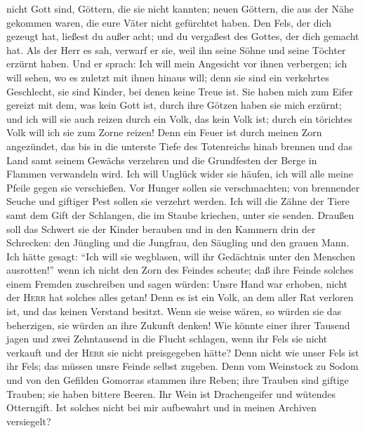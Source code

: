 nicht Gott sind, Göttern, die sie nicht kannten; neuen Göttern, die aus
der Nähe gekommen waren, die eure Väter nicht gefürchtet haben.
 Den Fels, der dich gezeugt hat, ließest du außer acht;
und du vergaßest des Gottes, der dich gemacht hat.  Als
der Herr es sah, verwarf er sie, weil ihn seine Söhne und seine Töchter
erzürnt haben.  Und er sprach: Ich will mein Angesicht
vor ihnen verbergen; ich will sehen, wo es zuletzt mit ihnen hinaus
will; denn sie sind ein verkehrtes Geschlecht, sie sind Kinder, bei
denen keine Treue ist.  Sie haben mich zum Eifer gereizt
mit dem, was kein Gott ist, durch ihre Götzen haben sie mich erzürnt;
und ich will sie auch reizen durch ein Volk, das kein Volk ist; durch
ein törichtes Volk will ich sie zum Zorne reizen!  Denn
ein Feuer ist durch meinen Zorn angezündet, das bis in die unterste
Tiefe des Totenreichs hinab brennen und das Land samt seinem Gewächs
verzehren und die Grundfesten der Berge in Flammen verwandeln wird.
 Ich will Unglück wider sie häufen, ich will alle meine
Pfeile gegen sie verschießen.  Vor Hunger sollen sie
verschmachten; von brennender Seuche und giftiger Pest sollen sie
verzehrt werden. Ich will die Zähne der Tiere samt dem Gift der
Schlangen, die im Staube kriechen, unter sie senden. 
Draußen soll das Schwert sie der Kinder berauben und in den Kammern drin
der Schrecken: den Jüngling und die Jungfrau, den Säugling und den
grauen Mann.  Ich hätte gesagt: ``Ich will sie wegblasen,
will ihr Gedächtnis unter den Menschen ausrotten!''  wenn
ich nicht den Zorn des Feindes scheute; daß ihre Feinde solches einem
Fremden zuschreiben und sagen würden: Unsre Hand war erhoben, nicht der
\textsc{Herr} hat solches alles getan!  Denn es ist ein
Volk, an dem aller Rat verloren ist, und das keinen Verstand besitzt.
 Wenn sie weise wären, so würden sie das beherzigen, sie
würden an ihre Zukunft denken!  Wie könnte einer ihrer
Tausend jagen und zwei Zehntausend in die Flucht schlagen, wenn ihr Fels
sie nicht verkauft und der \textsc{Herr} sie nicht preisgegeben hätte?
 Denn nicht wie unser Fels ist ihr Fels; das müssen unsre
Feinde selbst zugeben.  Denn vom Weinstock zu Sodom und
von den Gefilden Gomorras stammen ihre Reben; ihre Trauben sind giftige
Trauben; sie haben bittere Beeren.  Ihr Wein ist
Drachengeifer und wütendes Otterngift.  Ist solches nicht
bei mir aufbewahrt und in meinen Archiven versiegelt? 
